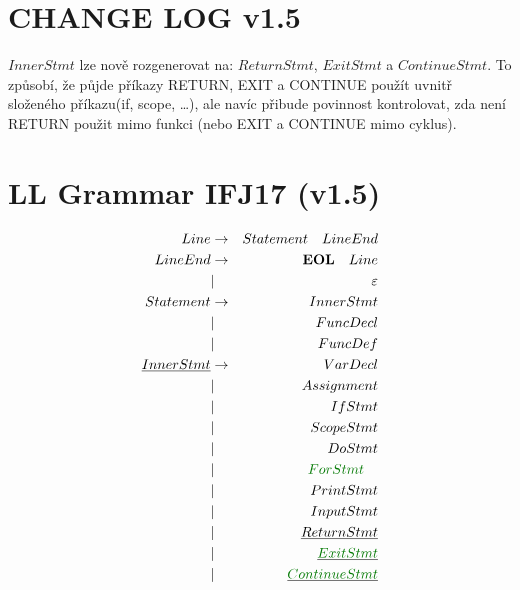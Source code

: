 \documentclass[a4paper,11pt,landscape,leqno]{article}
\begin{document}
\section{CHANGE LOG v1.5}
$InnerStmt$ lze nově rozgenerovat na: $ReturnStmt$, $ExitStmt$ a $ContinueStmt$. To způsobí, že půjde příkazy RETURN, EXIT a CONTINUE použít uvnitř složeného příkazu(if, scope, \dots), ale navíc přibude povinnost kontrolovat, zda není RETURN použit mimo funkci (nebo EXIT a CONTINUE mimo cyklus).
\section{LL Grammar IFJ17 (v1.5)}
\begin{eqnarray}
Line        &   \rightarrow     & Statement\quad LineEnd    \\
LineEnd     & \rightarrow       & \textbf{EOL}\quad Line   \\
            &       |           & \varepsilon         \\
Statement   &   \rightarrow     & InnerStmt  \\
            &       |           & FuncDecl    \\
            &       |           & FuncDef    \\
\underline{InnerStmt}   &   \rightarrow     & VarDecl  \\
            &       |           & Assignment    \\
            &       |           & IfStmt    \\
            &       |           & ScopeStmt   \\
            &       |           & DoStmt  \\
            &       |           & \textcolor{green1}{ForStmt}\quad  \\
            &       |           & PrintStmt \\
            &       |           & InputStmt  \\
            &       |           & \underline{ReturnStmt}  \\
            &       |           & \underline{\textcolor{green1}{ExitStmt}}  \\
            &       |           & \underline{\textcolor{green1}{ContinueStmt}}  \\

\end{eqnarray}
\end{document}

